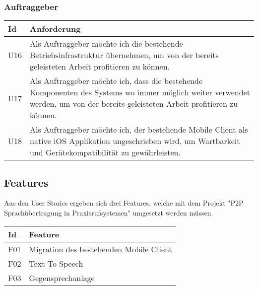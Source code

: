 \subsubsection*{Auftraggeber}

\begin{table}[h]
    \centering
    \begin{tabular}{|l|p{15cm}|}
        \hline
        \textbf{Id} & \textbf{Anforderung}                                                                                                                                                             \\
        \hline
        U16           & Als Auftraggeber möchte ich die bestehende Betriebsinfrastruktur übernehmen, um von der bereits geleisteten Arbeit profitieren zu können.                                        \\
        \hline
        U17           & Als Auftraggeber möchte ich, dass die bestehende Komponenten des Systems wo immer möglich weiter verwendet werden, um von der bereits geleisteten Arbeit profitieren zu können. \\
        \hline
        U18           & Als Auftraggeber möchte ich, der bestehende Mobile Client als native iOS Applikation ungeschrieben wird, um Wartbarkeit und Gerätekompatibilität zu gewährleisten. \\
        \hline
    \end{tabular}\label{tab:userstories3}
\end{table}

\subsection*{Features}

Aus den User Stories ergeben sich drei Features, welche mit dem Projekt "P2P Sprachübertragung in Praxisrufsystemen"
umgesetzt werden müssen.

\begin{table}[h]
    \centering
    \begin{tabular}{|l|p{15cm}|}
        \hline
        \textbf{Id} & \textbf{Feature}                                                                                                                                                             \\
        \hline
        F01           & Migration des bestehenden Mobile Client                                        \\
        \hline
        F02           & Text To Speech \\
        \hline
        F03           & Gegensprechanlage \\
        \hline
    \end{tabular}\label{tab:features}
\end{table}



\clearpage
